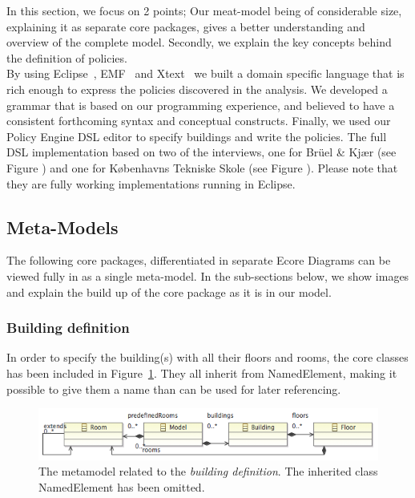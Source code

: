 In this section, we focus on 2 points; Our meat-model being of considerable size, explaining it as separate core packages, gives a better understanding and overview of the complete model. Secondly, we explain the key concepts behind the definition of policies.\\
 
By using Eclipse~\cite{eclipse}, EMF~\cite{emf} and Xtext~\cite{xtext} we built a domain specific language that is rich enough to express the policies discovered in the analysis. We developed a grammar that is based on our programming experience, and believed to have a consistent forthcoming syntax and conceptual constructs. Finally, we used our Policy Engine DSL editor to specify buildings and write the policies. The full DSL implementation based on two of the interviews, one for Br\"{u}el \& Kj\ae r (see Figure ) and one for K\o benhavns Tekniske Skole (see Figure ). Please note that they are fully working implementations running in Eclipse.

\subsection{Meta-Models}

The following core packages, differentiated in separate Ecore Diagrams can be viewed fully in  as a single meta-model. In the sub-sections below, we show images and explain the build up of the core package as it is in our model. 

\subsubsection{Building definition}
In order to specify the building(s) with all their floors and rooms, the core classes has been included in Figure \ref{fig:ecore-building-definition}. They all inherit from NamedElement, making it possible to give them a name than can be used for later referencing.
\begin{figure}[h]
  \centering \includegraphics[scale=.5]{ecore-building-definition.png}  
	\caption{The metamodel related to the \textit{building definition}. The inherited class NamedElement has been omitted.}
	\label{fig:ecore-building-definition}
\end{figure}

